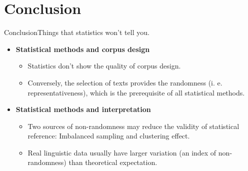 %
%
%

\section{Conclusion}
\begin{frame}[t]{Conclusion}{Things that statistics won't tell you.}
	\begin{itemize}
		
		\item \textbf{Statistical methods and corpus design}
		\begin{itemize}
			\item Statistics don't show the quality of corpus design.
			\item Conversely, the selection of texts provides the randomness (i. e. representativeness), which is the prerequisite of all statistical methods. 
		\end{itemize}
		\bigbreak
		
		\item \textbf{Statistical methods and interpretation}
		\begin{itemize}
			\item Two sources of non-randomness may reduce the validity of statistical reference: Imbalanced sampling and clustering effect.
			\item Real linguistic data usually have larger variation (an index of non-randomness) than theoretical expectation. 
		\end{itemize}
		
	\end{itemize}
\end{frame}

